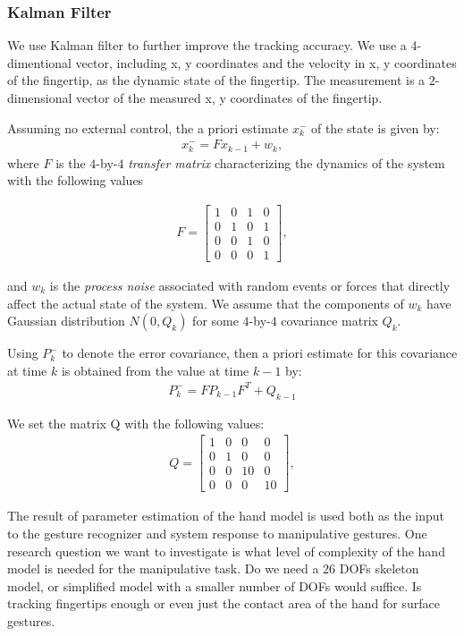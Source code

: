 \subsubsection{Kalman Filter}
We use Kalman filter to further improve the tracking accuracy. We use a
$4$-dimentional vector, including x, y coordinates and the velocity in x, y
coordinates of the fingertip, as the dynamic state of the fingertip.
The measurement is a $2$-dimensional vector of the measured x, y
coordinates of the fingertip. 

Assuming no external control, the a priori estimate $x_k^-$ of the state is
given by:
\begin{align*}
x_k^- = Fx_{k - 1} + w_k,
\end{align*}
where $F$ is the $4$-by-$4$ \textit{transfer matrix} characterizing the
dynamics of the system with the following values

\begin{align*}
F = \left[ \begin{array}{cccc}
	1 & 0 & 1 & 0 \\
	0 & 1 & 0 & 1 \\
	0 & 0 & 1 & 0 \\
	0 & 0 & 0 & 1 \end{array} \right],
\end{align*}

and $w_k$ is the
\textit{process noise} associated with random events or forces that directly affect the actual state of the system. We assume that the components of $w_k$
have Gaussian distribution $N(0, Q_k)$ for some $4$-by-$4$ covariance matrix
$Q_k$.

Using $P_k^-$ to denote the error covariance, then a priori estimate for this
covariance at time $k$ is obtained from the value at time $k - 1$ by:
\begin{align*}
P_k^- = FP_{k - 1}F^T + Q_{k - 1}
\end{align*}

We set the matrix Q with the following values:
\begin{align*}
Q = \left[ \begin{array}{cccc}
	1 & 0 & 0 & 0 \\
	0 & 1 & 0 & 0 \\
	0 & 0 & 10 & 0 \\
	0 & 0 & 0 & 10 \end{array} \right],
\end{align*}
  
The result of parameter estimation of the hand model is used both as the input
to the gesture recognizer and system response to manipulative gestures. One
research question we want to investigate is what level of complexity of the
hand model is needed for the manipulative task. Do we need a 26 DOFs skeleton
model, or simplified model with a smaller number of DOFs would suffice. Is
tracking fingertips enough or even just the contact area of the hand for surface
gestures.

